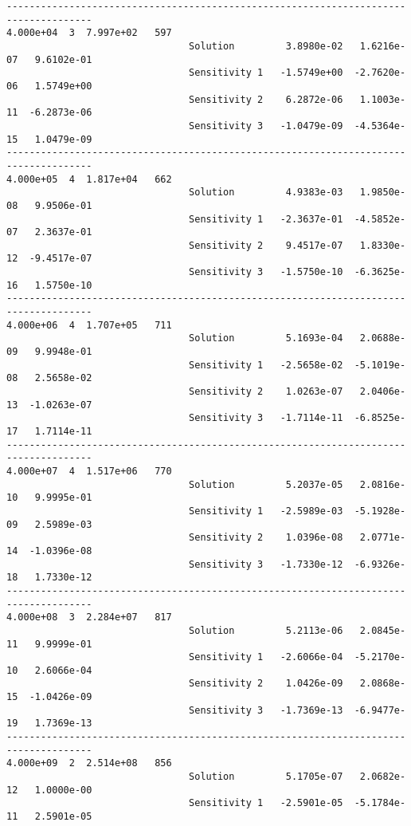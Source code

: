\begin{verbatim}
-------------------------------------------------------------------------------------
4.000e+04  3  7.997e+02   597
                                Solution         3.8980e-02   1.6216e-07   9.6102e-01 
                                Sensitivity 1   -1.5749e+00  -2.7620e-06   1.5749e+00 
                                Sensitivity 2    6.2872e-06   1.1003e-11  -6.2873e-06 
                                Sensitivity 3   -1.0479e-09  -4.5364e-15   1.0479e-09 
-------------------------------------------------------------------------------------
4.000e+05  4  1.817e+04   662
                                Solution         4.9383e-03   1.9850e-08   9.9506e-01 
                                Sensitivity 1   -2.3637e-01  -4.5852e-07   2.3637e-01 
                                Sensitivity 2    9.4517e-07   1.8330e-12  -9.4517e-07 
                                Sensitivity 3   -1.5750e-10  -6.3625e-16   1.5750e-10 
-------------------------------------------------------------------------------------
4.000e+06  4  1.707e+05   711
                                Solution         5.1693e-04   2.0688e-09   9.9948e-01 
                                Sensitivity 1   -2.5658e-02  -5.1019e-08   2.5658e-02 
                                Sensitivity 2    1.0263e-07   2.0406e-13  -1.0263e-07 
                                Sensitivity 3   -1.7114e-11  -6.8525e-17   1.7114e-11 
-------------------------------------------------------------------------------------
4.000e+07  4  1.517e+06   770
                                Solution         5.2037e-05   2.0816e-10   9.9995e-01 
                                Sensitivity 1   -2.5989e-03  -5.1928e-09   2.5989e-03 
                                Sensitivity 2    1.0396e-08   2.0771e-14  -1.0396e-08 
                                Sensitivity 3   -1.7330e-12  -6.9326e-18   1.7330e-12 
-------------------------------------------------------------------------------------
4.000e+08  3  2.284e+07   817
                                Solution         5.2113e-06   2.0845e-11   9.9999e-01 
                                Sensitivity 1   -2.6066e-04  -5.2170e-10   2.6066e-04 
                                Sensitivity 2    1.0426e-09   2.0868e-15  -1.0426e-09 
                                Sensitivity 3   -1.7369e-13  -6.9477e-19   1.7369e-13 
-------------------------------------------------------------------------------------
4.000e+09  2  2.514e+08   856
                                Solution         5.1705e-07   2.0682e-12   1.0000e-00 
                                Sensitivity 1   -2.5901e-05  -5.1784e-11   2.5901e-05 

\end{verbatim}
